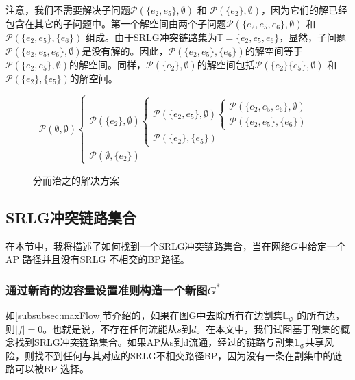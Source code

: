 注意，我们不需要解决子问题${{\mathcal{P}}(\{ e_2,e_5\}, \emptyset)}$ 和 ${{\mathcal{P}}(\{ e_2\},\emptyset )}$，因为它们的解已经包含在其它的子问题中。第一个解空间由两个子问题${{\mathcal P}(\{ e_2,e_5,e_6\} ,\emptyset )}$ 和 ${{\mathcal P}(\{ e_2,e_5\} ,\{ e_6\} )}$ 组成。由于SRLG冲突链路集为$\mathbb{T}=\{e_2,e_5,e_6\}$，显然，子问题${{\mathcal P}(\{ e_2,e_5,e_6\} ,\emptyset )}$是没有解的。因此，${{\mathcal P}(\{ e_2,e_5\} ,\{ e_6\} )}$的解空间等于${{\mathcal{P}}(\{ e_2, e_5\}, \emptyset)}$的解空间。同样，${{\mathcal{P}}(\{ e_2\},\emptyset )}$的解空间包括${{\mathcal{P}}(\{ e_2\} \{ e_5\}, \emptyset)}$  和 ${{\mathcal{P}}(\{ e_2\} ,\{ e_5\} )}$的解空间。
\begin{figure}[htbp]
\large{
\begin{equation*}
{\mathcal P}(\emptyset ,\emptyset )\left\{ {\begin{array}{*{20}{l}}
{{\mathcal P}(\{ e_2\} ,\emptyset )\left\{ {\begin{array}{*{20}{l}}
{{\mathcal P}(\{ e_2,e_5\} ,\emptyset )\left\{ {\begin{array}{*{20}{l}}
{{\mathcal P}(\{ e_2,e_5,e_6\} ,\emptyset )}\\
{\boxed{{\mathcal P}(\{ e_2,e_5\} ,\{ e_6\} )}}
\end{array}} \right.}\\
{\boxed{{\mathcal P}(\{ e_2\} ,\{ e_5\} )}}
\end{array}} \right.}\\
{\boxed{{\mathcal P}(\emptyset ,\{ e_2\} )}}
\end{array}} \right.
\end{equation*}
}
\caption{分而治之的解决方案}
\label{fig:DividedConquer}
\end{figure}




\subsection{SRLG冲突链路集合}
在本节中，我将描述了如何找到一个SRLG冲突链路集合，当在网络$G$中给定一个AP 路径并且没有SRLG 不相交的BP路径。
\subsubsection{通过新奇的边容量设置准则构造一个新图$G^*$}
如\ref{subsubsec:maxFlow}节介绍的，如果在图G中去除所有在边割集$\mathbb{\mathbb{L}}_{\Phi}$ 的所有边，则$|f| = 0$。也就是说，不存在任何流能从$s$到$d$。在本文中，我们试图基于割集的概念找到SRLG冲突链路集合。如果AP从s到d流通，经过的链路与割集$\mathbb{\mathbb{L}}_{\Phi}$共享风险，则找不到任何与其对应的SRLG不相交路径BP，因为没有一条在割集中的链路可以被BP 选择。

